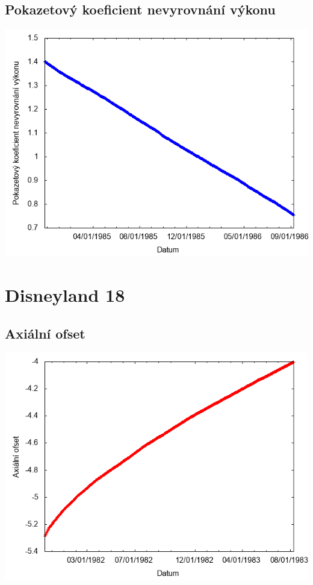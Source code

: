 \documentclass[a4paper,twoside,11pt]{article}
\begin{document}
\subsection*{Pokazetový koeficient nevyrovnání výkonu}
\begin{center}
\includegraphics[width=.8\textwidth]{graphs/Disneyland_17_fha.png}
\end{center}

\newpage
\section*{Disneyland 18}
\subsection*{Axiální ofset}
\begin{center}
\includegraphics[width=.8\textwidth]{graphs/Disneyland_18_ao.png}
\end{center}
\end{document}
